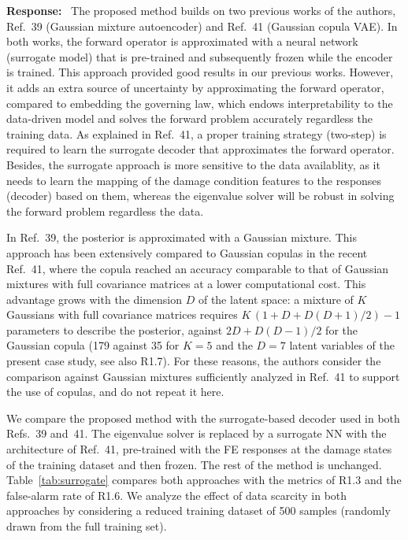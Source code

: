 \documentclass[11pt]{article}
\newenvironment{response}{\par\smallskip\noindent\color{resp}\textbf{Response:}\ }{\par}
\begin{document}
\begin{response}
	The proposed method builds on two previous works of the authors, Ref.~39 (Gaussian mixture autoencoder) and Ref.~41 (Gaussian copula VAE).
	In both works, the forward operator is approximated with a neural network (surrogate model) that is pre-trained and subsequently frozen while the encoder is trained.
	This approach provided good results in our previous works.
	However, it adds an extra source of uncertainty by approximating the forward operator, compared to embedding the governing law, which endows interpretability to the data-driven model and solves the forward problem accurately regardless the training data. 
	As explained in Ref.~41, a proper training strategy (two-step) is required to learn the surrogate decoder that approximates the forward operator. 
	Besides, the surrogate approach is more sensitive to the data availablity, as it needs to learn the mapping of the damage condition features to the responses (decoder) based on them, whereas the eigenvalue solver will be robust in solving the forward problem regardless the data. 
	
	
	In Ref.~39, the posterior is approximated with a Gaussian mixture. This approach has been extensively compared to Gaussian copulas in the recent Ref.~41, where the copula reached an accuracy comparable to that of Gaussian mixtures with full covariance matrices at a lower computational cost.
	This advantage grows with the dimension $D$ of the latent space: a mixture of $K$ Gaussians with full covariance matrices requires $K\,(1+D+D(D+1)/2)-1$ parameters to describe the posterior, against $2D+D(D-1)/2$ for the Gaussian copula (179 against 35 for $K=5$ and the $D=7$ latent variables of the present case study, see also R1.7).
	For these reasons, the authors consider the comparison against Gaussian mixtures sufficiently analyzed in Ref.~41 to support the use of copulas, and do not repeat it here.
	
We compare the proposed method with the surrogate-based decoder used in both Refs.~39 and~41.
The eigenvalue solver is replaced by a surrogate NN with the architecture of Ref.~41, pre-trained with the FE responses at the damage states of the training dataset and then frozen. The rest of the method is unchanged. Table~\ref{tab:surrogate} compares both approaches with the metrics of R1.3 and the false-alarm rate of R1.6.
We analyze the effect of data scarcity in both approaches by considering a reduced training dataset of 500 samples (randomly drawn from the full training set).


\end{response}
\end{document}
